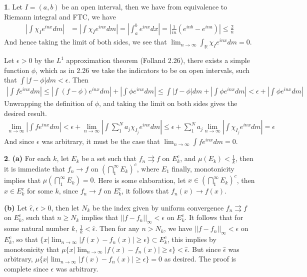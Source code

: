 \documentclass[10.5pt]{article}
\theoremstyle{definition}
\newtheorem{pb}{}
\newcommand{\set}[1]{\{#1\}}
\newcommand{\abs}[1]{\left\vert#1\right\vert}
\newcommand{\norm}[1]{\lvert\lvert#1\rvert\rvert}
\begin{document}
    \begin{pb}
        Let \(I = (a,b)\) be an open interval, then we have from equivalence to Riemann integral and FTC, we have
        \begin{align*}
            \abs{\int \chi_I e^{inx} dm} &= \abs{\int \chi_{\overline{I}} e^{inx} dm} = \abs{\int_a^b e^{inx} dx} = \abs{\frac{1}{in}(e^{inb} - e^{ina})} \leq \frac{2}{n}
        \end{align*}
        And hence taking the limit of both sides, we see that \(\lim_{n\to\infty}\int_\mathbb{R} \chi_I e^{inx} dm = 0\). 
        
        Let \(\epsilon > 0\) by the \(L^1\) approximation theorem (Folland 2.26), there exists
        a simple function \(\phi\), which as in 2.26 we take the indicators to be on open intervals, such that \(\int \abs{f - \phi}dm < \epsilon\). Then
        \begin{align*}
            \abs{\int f e^{inx}dm} \leq \abs{\int (f - \phi) e^{inx}dm} + \abs{\int \phi e^{inx}dm} \leq \int \abs{f - \phi} dm + \abs{\int \phi e^{inx}dm} < \epsilon + \abs{\int \phi e^{inx}dm}
        \end{align*}
        Unwrapping the definition of \(\phi\), and taking the limit on both sides gives the desired result.
        \begin{align*}
            \lim_{n\to\infty} \abs{\int f e^{inx}dm} < \epsilon + \lim_{n\to\infty}\abs{\int \sum_1^N a_j \chi_{I_j} e^{inx}dm} 
            \leq \epsilon + \sum_1^N a_j \lim_{n\to\infty}\abs{\int \chi_{I_j}e^{inx}dm} = \epsilon
        \end{align*}   
        And since \(\epsilon\) was arbitrary, it must be the case that \(\lim_{n\to\infty} \int f e^{inx}dm = 0\).
    \end{pb}
    \begin{pb}
        \textbf{(a)} For each \(k\), let \(E_k\) be a set such that \(f_n \rightrightarrows f\) on \(E_k^c\), and \(\mu(E_k) < \frac{1}{k}\), then it is immediate that
        \(f_n \to f\) on \(\left(\bigcap_1^\infty E_k \right)^c\), where \(E_1\) finally, monotonicity implies that \(\mu(\bigcap_1^\infty E_k) = 0\).
        Here is some elaboration, let \(x \in \left(\bigcap_1^\infty E_k \right)^c\), then \(x \in E_k^c\) for some \(k\), since \(f_n \to f\) on \(E_k^c\), it follows that \(f_n(x) \to f(x)\).

        \textbf{(b)} Let \(\hat{\epsilon}, \epsilon > 0\), then let \(N_k\) be the index given by uniform convergence \(f_n \rightrightarrows f\) on \(E_k^c\), such that \(n \geq N_k\) implies that
        \(\norm{f - f_n}_\infty < \epsilon\) on \(E_k^c\). It follows that for some natural number \(k\), \(\frac{1}{k} < \hat{\epsilon}\). Then for any \(n > N_k\), we have
        \(\norm{f - f_n}_\infty < \epsilon\) on \(E_k^c\), so that \(\set{x \vert \lim_{n\to\infty} \abs{f(x) - f_n(x)} \geq \epsilon} \subset E_k^c\), this implies by monotonicity that
        \(\mu\set{x \vert \lim_{n\to\infty} \abs{f(x) - f_n(x)} \geq \epsilon} < \hat{\epsilon}\). But since \(\hat{\epsilon}\) was arbitrary, 
        \(\mu\set{x \vert \lim_{n\to\infty} \abs{f(x) - f_n(x)} \geq \epsilon} = 0\) as desired. The proof is complete since \(\epsilon\) was arbitrary.
    \end{pb}
\end{document}
